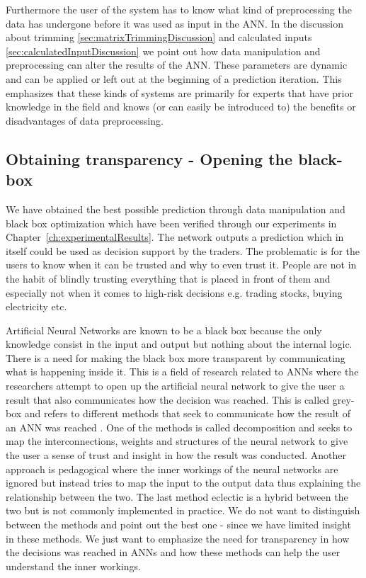 Furthermore the user of the system has to know what kind of preprocessing the data has undergone before it was used as input in the ANN. In the discussion about trimming \ref{sec:matrixTrimmingDiscussion} and calculated inputs \ref{sec:calculatedInputDiscussion} we point out how data manipulation and preprocessing can alter the results of the ANN. These parameters are dynamic and can be applied or left out at the beginning of a prediction iteration. This emphasizes that these kinds of systems are primarily for experts that have prior knowledge in the field and knows (or can easily be introduced to) the benefits or disadvantages of data preprocessing.


\subsection{Obtaining transparency - Opening the black-box}
We have obtained the best possible prediction through data manipulation and black box optimization which have been verified through our experiments in Chapter~\ref{ch:experimentalResults}. The network outputs a prediction which in itself could be used as decision support by the traders. The problematic is for the users to know when it can be trusted and why to even trust it. People are not in the habit of blindly trusting everything that is placed in front of them and especially not when it comes to high-risk decisions e.g. trading stocks, buying electricity etc.

Artificial Neural Networks are known to be a black box \cite{fromBlackBoxToTransparentBox} because the only knowledge consist in the input and output but nothing about the internal logic. There is a need for making the black box more transparent by communicating what is happening inside it. This is a field of research related to ANNs where the researchers attempt to open up the artificial neural network to give the user a result that also communicates how the decision was reached. This is called grey-box and refers to different methods that seek to communicate how the result of an ANN was reached \cite{young2010using}. One of the methods is called decomposition and seeks to map the interconnections, weights and structures of the neural network to give the user a sense of trust and insight in how the result was conducted. Another approach is pedagogical where the inner workings of the neural networks are ignored but instead tries to map the input to the output data thus explaining the relationship between the two. The last method eclectic is a hybrid between the two but is not commonly implemented in practice. We do not want to distinguish between the methods and point out the best one - since we have limited insight in these methods. We just want to emphasize the need for transparency in how the decisions was reached in ANNs and how these methods can help the user understand the inner workings.

